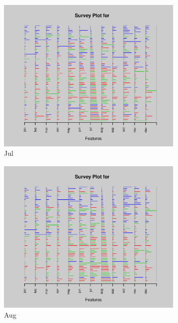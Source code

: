 \documentclass{article}
\begin{document}
\begin{enumerate}[leftmargin = 0 em, label = \arabic*., font = \bfseries]
\begin{enumerate}
\begin{enumerate}
\begin{figure}[!htb]
\begin{subfigure}[b]{0.3\textwidth}
        	\includegraphics[width = \textwidth]{3cii7.eps}
        	\caption{Jul}
        	\end{subfigure}%
        	\begin{subfigure}[b]{0.3\textwidth}
        	\includegraphics[width = \textwidth]{3cii8.eps}
        	\caption{Aug}
        	\end{subfigure}%
        	\begin{subfigure}[b]{0.3\textwidth}

\end{subfigure}
\end{figure}
\end{enumerate}
\end{enumerate}
\end{enumerate}
\end{document}
